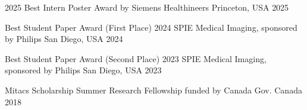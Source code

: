 


\begin{cvhonors}

\cvhonor
{2025 Best Intern Poster Award} %
{by Siemens Healthineers} %
{Princeton, USA} %
{2025} %

\cvhonor
{Best Student Paper Award (First Place)} %
{2024 SPIE Medical Imaging, sponsored by Philips} %
{San Diego, USA} %
{2024} %

\cvhonor
{Best Student Paper Award (Second Place)} %
{2023 SPIE Medical Imaging, sponsored by Philips} %
{San Diego, USA} %
{2023} %


  \cvhonor
    {Mitacs Scholarship} %
    {Summer Research Fellowship funded by Canada Gov.} %
    {Canada} %
    {2018} %
    
    








\end{cvhonors}
